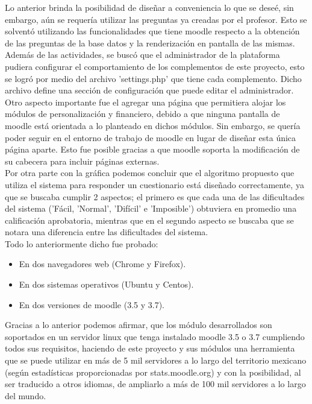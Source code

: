 \noident Lo anterior brinda la posibilidad de diseñar a conveniencia lo que se deseé, sin embargo, aún se requería utilizar las preguntas
ya creadas por el profesor. Esto se solventó utilizando las funcionalidades que tiene moodle respecto a la obtención de las preguntas
de la base datos y la renderización en pantalla de las mismas.\\

\noindent Además de las actividades, se buscó que el administrador de la plataforma pudiera configurar el comportamiento
de los complementos de este proyecto, esto se logró por medio del archivo 'settings.php' que tiene cada complemento. Dicho archivo
define una sección de configuración que puede editar el administrador.\\

\noindent Otro aspecto importante fue el agregar una página que permitiera alojar los módulos de personalización y financiero, 
debido a que ninguna pantalla de moodle está orientada a lo planteado en dichos módulos. Sin embargo, se quería poder seguir en el entorno de trabajo
de moodle en lugar de diseñar esta única página aparte. Esto fue posible gracias a que moodle soporta la modificación
de su cabecera para incluir páginas externas.\\

\noindent Por otra parte con la gráfica  podemos concluir que el algoritmo propuesto
 que utiliza el sistema para responder un cuestionario
está diseñado correctamente, ya que se buscaba cumplir 2 aspectos;
el primero es que cada una de las dificultades del sistema ('Fácil, 'Normal', 'Difícil' e 'Imposible') 
obtuviera en promedio una calificación aprobatoria, mientras que en el segundo aspecto
se buscaba que se notara una diferencia entre las dificultades del sistema.\\


\noindent Todo lo anteriormente dicho fue probado:
\begin{itemize}
    \item  En dos navegadores web (Chrome y Firefox).
    \item  En dos sistemas operativos (Ubuntu  y Centos).
    \item  En dos versiones de moodle (3.5 y 3.7).
\end{itemize}

\noindent Gracias a lo anterior podemos afirmar, que los módulo desarrollados son soportados en un
servidor linux que tenga instalado moodle 3.5 o 3.7 cumpliendo todos sus requisitos, haciendo de este proyecto y sus módulos una herramienta que se puede utilizar
en más de 5 mil servidores a lo largo del territorio mexicano (según estadísticas proporcionadas por stats.moodle.org) y con la posibilidad,
al ser traducido a otros idiomas, de ampliarlo a más de 100 mil servidores a lo largo del mundo.\\

